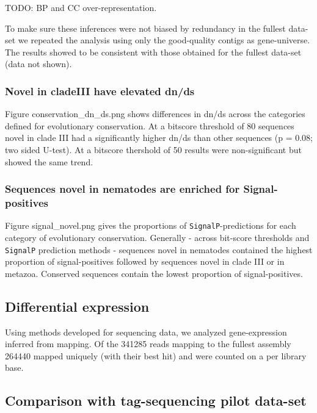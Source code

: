 \documentclass[10pt]{bmc_article}
\newenvironment{bmcformat}{\begin{raggedright}\baselineskip20pt\sloppy\setboolean{publ}{false}}{\end{raggedright}\baselineskip20pt\sloppy}
\begin{document}
\begin{bmcformat}
TODO: BP and CC over-representation. 

To make sure these inferences were not biased by redundancy in the
fullest data-set we repeated the analysis using only the good-quality
contigs as gene-universe. The results showed to be consistent with
those obtained for the fullest data-set (data not shown).

\subsubsection*{Novel in cladeIII have elevated dn/ds}



Figure conservation\_dn\_ds.png shows differences in dn/ds across the
categories defined for evolutionary conservation. At a bitscore
threshold of 80 sequences novel in clade III had a significantly
higher dn/ds than other sequences (p =
0.08; two sided U-test). At a
bitscore thershold of 50 results were non-significant but showed the
same trend.

\subsubsection*{Sequences novel in nematodes are enriched for
  Signal-positives}


Figure signal\_novel.png gives the proportions of
\texttt{SignalP}-predictions for each category of evolutionary
conservation. Generally - across bit-score thresholds and
\texttt{SignalP} prediction methods - sequences novel in nematodes
contained the highest proportion of signal-positives followed by
sequences novel in clade III or in metazoa. Conserved sequences
contain the lowest proportion of signal-positives.

\subsection*{Differential expression}
                

Using methods developed for sequencing data, we analyzed
gene-expression inferred from mapping. Of the 341285 reads
mapping to the fullest assembly 264440 mapped uniquely
(with their best hit) and were counted on a per library base.

\subsection*{Comparison with tag-sequencing pilot data-set}



\end{bmcformat}
\end{document}
